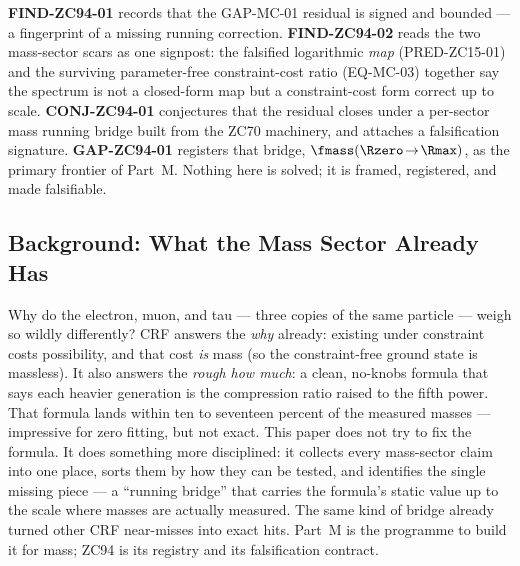 \documentclass[12pt, a4paper]{article}
\begin{document}
\textbf{FIND-ZC94-01} records that the GAP-MC-01 residual is signed and
bounded --- a fingerprint of a missing running correction. \textbf{FIND-ZC94-02}
reads the two mass-sector scars as one signpost: the falsified logarithmic
\emph{map} (PRED-ZC15-01) and the surviving parameter-free constraint-cost
ratio (EQ-MC-03) together say the spectrum is not a closed-form map but a
constraint-cost form correct up to scale. \textbf{CONJ-ZC94-01} conjectures
that the residual closes under a per-sector mass running bridge built from the
ZC70 machinery, and attaches a falsification signature. \textbf{GAP-ZC94-01}
registers that bridge, $\fmass(\Rzero\!\to\!\Rmax)$, as the primary frontier of
Part~M. Nothing here is solved; it is framed, registered, and made falsifiable.


\subsection{Background: What the Mass Sector Already Has}
\label{sec:background-zc94}

\begin{keybox}[title={If you are just arriving --- Part~M in plain language}]
\sloppy
Why do the electron, muon, and tau --- three copies of the same particle ---
weigh so wildly differently? CRF answers the \emph{why} already: existing under
constraint costs possibility, and that cost \emph{is} mass (so the constraint-free
ground state is massless). It also answers the \emph{rough how much}: a clean,
no-knobs formula that says each heavier generation is the compression ratio
raised to the fifth power. That formula lands within ten to seventeen percent
of the measured masses --- impressive for zero fitting, but not exact. This
paper does not try to fix the formula. It does something more disciplined:
it collects every mass-sector claim into one place, sorts them by how they can
be tested, and identifies the single missing piece --- a ``running bridge''
that carries the formula's static value up to the scale where masses are
actually measured. The same kind of bridge already turned other CRF near-misses
into exact hits. Part~M is the programme to build it for mass; ZC94 is its
registry and its falsification contract.
\end{keybox}
\end{document}
